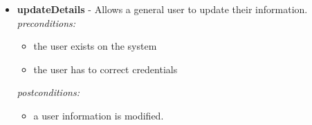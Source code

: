 \documentclass[a4paper,12pt]{article}
\begin{document}
\begin{itemize}
		\item \textbf{updateDetails} - Allows a general user to update their information.\\[0.5cm]
		\textit{preconditions:}
		\begin{itemize}
			\item the user exists on the system
			\item the user has to correct credentials
		\end{itemize}
		
		\textit{postconditions:}
		\begin{itemize}
			\item a user information is modified.
		\end{itemize}
	\end{itemize}
	 
	 
\end{document}
